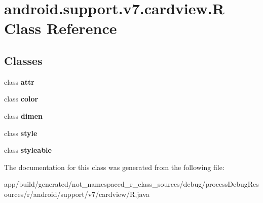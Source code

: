 \hypertarget{classandroid_1_1support_1_1v7_1_1cardview_1_1_r}{}\section{android.\+support.\+v7.\+cardview.\+R Class Reference}
\label{classandroid_1_1support_1_1v7_1_1cardview_1_1_r}
\subsection*{Classes}
\begin{DoxyCompactItemize}
\item 
class {\bfseries attr}
\item 
class {\bfseries color}
\item 
class {\bfseries dimen}
\item 
class {\bfseries style}
\item 
class {\bfseries styleable}
\end{DoxyCompactItemize}


The documentation for this class was generated from the following file\+:\begin{DoxyCompactItemize}
\item 
app/build/generated/not\+\_\+namespaced\+\_\+r\+\_\+class\+\_\+sources/debug/process\+Debug\+Resources/r/android/support/v7/cardview/R.\+java\end{DoxyCompactItemize}

